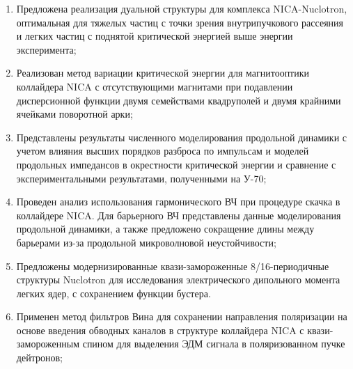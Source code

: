 \par {}
\begin{enumerate}[beginpenalty=10000] %
	\item 	Предложена реализация дуальной структуры для комплекса NICA-Nuclotron, оптимальная для тяжелых частиц с точки зрения внутрипучкового рассеяния и легких частиц с поднятой критической энергией выше энергии эксперимента; \cite{Kolokolchikov:2025_dual, Syresin:2021_polar}
	\item	Реализован метод вариации критической энергии для магнитооптики коллайдера NICA с отсутствующими магнитами при подавлении дисперсионной функции двумя семействами квадруполей и двумя крайними ячейками поворотной арки; \cite{Kolokolchikov:2021trans, Kolokolchikov:2023_pecular}
	\item	Представлены результаты численного моделирования продольной динамики с учетом влияния высших порядков разброса по импульсам и моделей продольных импедансов в окрестности критической энергии и сравнение с экспериментальными результатами, полученными на У-70; \cite{Kolokolchikov:2025_U70, Kolokolchikov:2025_jump}
	\item 	Проведен анализ использования гармонического ВЧ при процедуре скачка в коллайдере NICA. Для барьерного ВЧ представлены данные моделирования продольной динамики, а также предложено сокращение длины между барьерами из-за продольной микроволновой неустойчивости; \cite{Kolokolchikov:2024_bb_rupac, Kolokolchikov:2023_bb_IPAC, Kolokolchikov:2024_bb_dspin}
	\item	Предложены модернизированные квази-замороженные 8/16-периодичные структуры Nuclotron для исследования электрического дипольного момента легких ядер, с сохранением функции бустера. \cite{Senichev:2023_QFS, Senichev:2023_nuclotron, Kolokolchikov:2025_nuclotron}
	\item	Применен метод фильтров Вина для сохранении направления поляризации на основе введения обводных каналов в структуре коллайдера NICA с квази-замороженным спином для выделения ЭДМ сигнала в поляризованном пучке дейтронов;\cite{Kolokolchikov:2023_bypass, Kolokolchikov:2023_bypass_IPAC, Senichev:2024_nica_edm, Kolokolchikov:2023_sc, Kolokolchikov:2023_sc_IPAC}
\end{enumerate}

